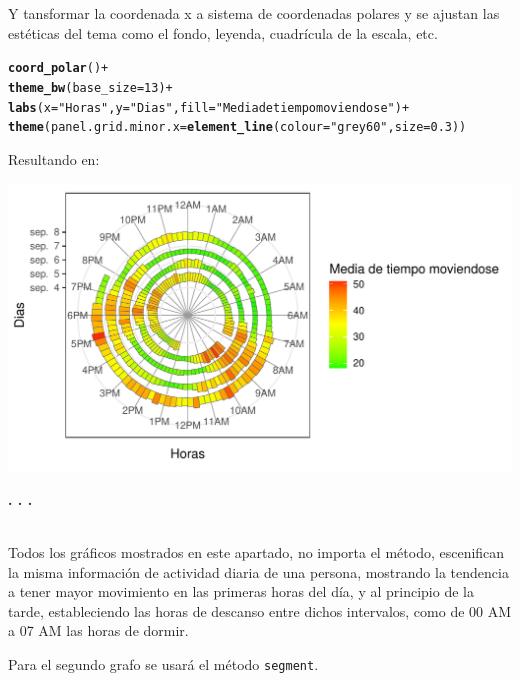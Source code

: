 \documentclass{article}\usepackage[]{graphicx}\usepackage[]{color}
\makeatletter
\def\maxwidth{ %
  \ifdim\Gin@nat@width>\linewidth
    \linewidth
  \else
    \Gin@nat@width
  \fi
}
\newcommand{\hlnum}[1]{\textcolor[rgb]{0.686,0.059,0.569}{#1}}%
\newcommand{\hlstr}[1]{\textcolor[rgb]{0.192,0.494,0.8}{#1}}%
\newcommand{\hlopt}[1]{\textcolor[rgb]{0,0,0}{#1}}%
\newcommand{\hlstd}[1]{\textcolor[rgb]{0.345,0.345,0.345}{#1}}%
\newcommand{\hlkwc}[1]{\textcolor[rgb]{0.333,0.667,0.333}{#1}}%
\newcommand{\hlkwd}[1]{\textcolor[rgb]{0.737,0.353,0.396}{\textbf{#1}}}%
\newenvironment{kframe}{%
 \def\at@end@of@kframe{}%
 \ifinner\ifhmode%
  \def\at@end@of@kframe{\end{minipage}}%
  \begin{minipage}{\columnwidth}%
 \fi\fi%
 \def\FrameCommand##1{\hskip\@totalleftmargin \hskip-\fboxsep
 \colorbox{shadecolor}{##1}\hskip-\fboxsep
     \hskip-\linewidth \hskip-\@totalleftmargin \hskip\columnwidth}%
 \MakeFramed {\advance\hsize-\width
   \@totalleftmargin\z@ \linewidth\hsize
   \@setminipage}}%
 {\par\unskip\endMakeFramed%
 \at@end@of@kframe}
\newenvironment{knitrout}{}{} %
\makeatother
\begin{document}
Y tansformar la coordenada x a sistema de coordenadas polares y se ajustan las est\'eticas del tema como el fondo, leyenda, cuadr\'icula de la escala, etc.
\begin{knitrout}
\color{fgcolor}\begin{kframe}
\begin{alltt}
  \hlkwd{coord_polar}\hlstd{()} \hlopt{+}
  \hlkwd{theme_bw}\hlstd{(}\hlkwc{base_size}\hlstd{=}\hlnum{13}\hlstd{)} \hlopt{+}
  \hlkwd{labs}\hlstd{(}\hlkwc{x}\hlstd{=}\hlstr{"Horas"}\hlstd{,}\hlkwc{y}\hlstd{=}\hlstr{"Dias"}\hlstd{,}\hlkwc{fill}\hlstd{=}\hlstr{"Media de tiempo moviendose"}\hlstd{)} \hlopt{+}
  \hlkwd{theme}\hlstd{(}\hlkwc{panel.grid.minor.x}\hlstd{=}\hlkwd{element_line}\hlstd{(}\hlkwc{colour}\hlstd{=}\hlstr{"grey60"}\hlstd{,} \hlkwc{size}\hlstd{=}\hlnum{0.3}\hlstd{))}
\end{alltt}
\end{kframe}
\end{knitrout}
\clearpage
Resultando en:
\begin{knitrout}
\color{fgcolor}

{\centering \includegraphics[width=\maxwidth]{figure/plot_rect-1} 

}



\end{knitrout}
\begin{center}
\textbf{. . .}
\end{center}
~\\
Todos los gr\'aficos mostrados en este apartado, no importa el m\'etodo, escenifican la misma informaci\'on de actividad diaria de una persona, mostrando la tendencia a tener mayor movimiento en las primeras horas del d\'ia, y al principio de la tarde, estableciendo las horas de descanso entre dichos intervalos, como de 00 AM a 07 AM las horas de dormir.~\par
Para el segundo grafo se usar\'a el m\'etodo \texttt{segment}.
\end{document}
